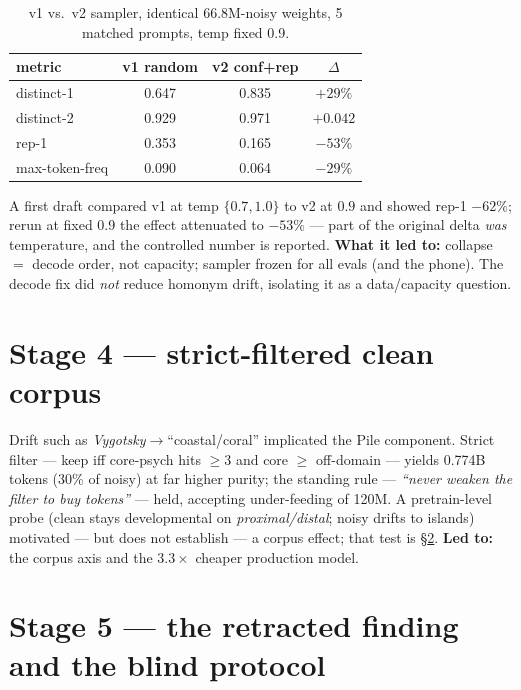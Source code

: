 \documentclass[11pt]{article}
\newcommand{\sixsix}{66.8M}
\newcommand{\onetwenty}{120M}
\begin{document}
\begin{table}[h]\centering\small
\caption{v1 vs.\ v2 sampler, identical \sixsix-noisy weights, 5 matched prompts, temp fixed 0.9.}
\label{tab:decode}
\begin{tabular}{lccc}
\toprule
metric & v1 random & v2 conf+rep & $\Delta$ \\
\midrule
distinct-1 & 0.647 & 0.835 & $+29\%$ \\
distinct-2 & 0.929 & 0.971 & $+0.042$ \\
rep-1 & 0.353 & 0.165 & $-53\%$ \\
max-token-freq & 0.090 & 0.064 & $-29\%$ \\
\bottomrule
\end{tabular}
\end{table}

A first draft compared v1 at temp $\{0.7,1.0\}$ to v2 at $0.9$ and showed rep-1 $-62\%$; rerun at fixed 0.9 the effect attenuated to $-53\%$ --- part of the original delta \emph{was} temperature, and the controlled number is reported. \textbf{What it led to:} collapse $=$ decode order, not capacity; sampler frozen for all evals (and the phone). The decode fix did \emph{not} reduce homonym drift, isolating it as a data/capacity question.

\section{Stage 4 --- strict-filtered clean corpus}\label{sec:clean}

Drift such as \emph{Vygotsky}$\to$``coastal/coral'' implicated the Pile component. Strict filter --- keep iff core-psych hits $\ge3$ and core $\ge$ off-domain --- yields 0.774B tokens (30\% of noisy) at far higher purity; the standing rule --- \emph{``never weaken the filter to buy tokens''} --- held, accepting under-feeding of \onetwenty. A pretrain-level probe (clean stays developmental on \emph{proximal/distal}; noisy drifts to islands) motivated --- but does not establish --- a corpus effect; that test is \S\ref{sec:retraction}. \textbf{Led to:} the corpus axis and the $3.3\times$ cheaper production model.

\section{Stage 5 --- the retracted finding and the blind protocol}\label{sec:retraction}
\end{document}
